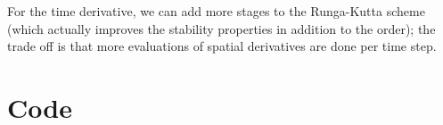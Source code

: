 \documentclass{article}
\begin{document}
For the time derivative, we can add more stages to the Runga-Kutta scheme (which actually improves the stability properties in addition to the order); the trade off is that more evaluations of spatial derivatives are done per time step.

\clearpage
\appendix
\section{Code}


\end{document}
